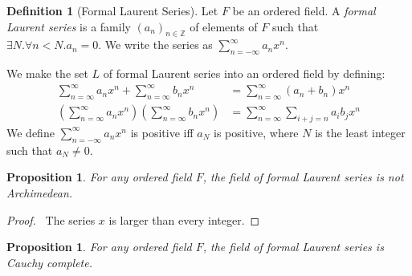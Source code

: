 \documentclass{article}
\let\qed\relax
\newtheorem{proposition}[axiom]{Proposition}
\theoremstyle{definition}
\newtheorem{definition}[axiom]{Definition}
\begin{document}
    \begin{definition}[Formal Laurent Series]
        Let $F$ be an ordered field. A \emph{formal Laurent series} is a family $(a_n)_{n \in \mathbb{Z}}$ of
        elements of $F$ such that $\exists N. \forall n < N. a_n = 0$. We write the series as
        $\sum_{n=-\infty}^\infty a_n x^n$.

        We make the set $L$ of formal Laurent series into an ordered field by defining:
        \begin{align*}
            \sum_{n=\infty}^\infty a_n x^n + \sum_{n=\infty}^\infty b_n x^n
            & = \sum_{n=\infty}^\infty (a_n + b_n) x^n \\
            \left(\sum_{n=\infty}^\infty a_n x^n \right) \left( \sum_{n=\infty}^\infty b_n x^n \right)
            & = \sum_{n=\infty}^\infty \sum_{i + j = n} a_i b_j x^n
        \end{align*}
        We define $\sum_{n=-\infty}^\infty a_n x^n$ is positive iff $a_N$ is positive, where $N$ is the least integer such that
        $a_N \neq 0$.
    \end{definition}

    \begin{proposition}
        For any ordered field $F$, the field of formal Laurent series is not Archimedean.
    \end{proposition}

    \begin{proof}
        \pf\ The series $x$ is larger than every integer. \qed
    \end{proof}

    \begin{proposition}
        For any ordered field $F$, the field of formal Laurent series is Cauchy complete.
    \end{proposition}
\end{document}
